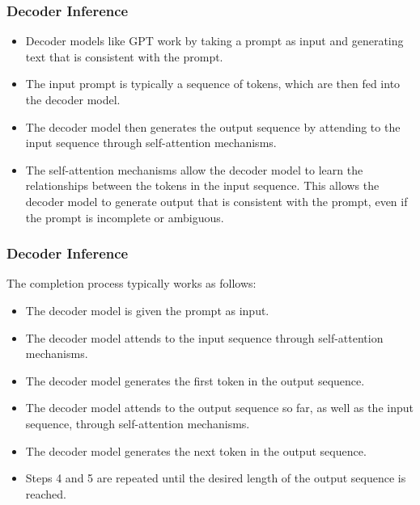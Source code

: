 \begin{frame}[fragile]\frametitle{Decoder Inference}

\begin{itemize}
\item Decoder models like GPT work by taking a prompt as input and generating text that is consistent with the prompt. 
\item The input prompt is typically a sequence of tokens, which are then fed into the decoder model. 
\item The decoder model then generates the output sequence by attending to the input sequence through self-attention mechanisms.
\item The self-attention mechanisms allow the decoder model to learn the relationships between the tokens in the input sequence. This allows the decoder model to generate output that is consistent with the prompt, even if the prompt is incomplete or ambiguous.
\end{itemize}

\end{frame}

\begin{frame}[fragile]\frametitle{Decoder Inference}

The completion process typically works as follows:

\begin{itemize}
\item The decoder model is given the prompt as input.
\item The decoder model attends to the input sequence through self-attention mechanisms.
\item The decoder model generates the first token in the output sequence.
\item The decoder model attends to the output sequence so far, as well as the input sequence, through self-attention mechanisms.
\item The decoder model generates the next token in the output sequence.
\item Steps 4 and 5 are repeated until the desired length of the output sequence is reached.
\end{itemize}

\end{frame}

